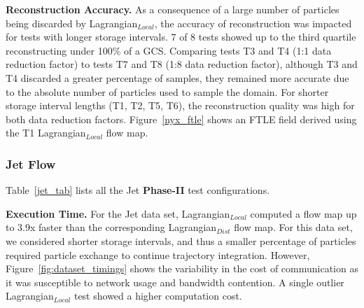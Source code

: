 \textbf{Reconstruction Accuracy.} As a consequence of a large number of particles being discarded by Lagrangian$_{Local}$, the accuracy of reconstruction was impacted for tests with longer storage intervals.
%
7 of 8 tests showed up to the third quartile reconstructing under 100\% of a GCS. 
%
Comparing tests T3 and T4 (1:1 data reduction factor) to tests T7 and T8 (1:8 data reduction factor), although T3 and T4 discarded a greater percentage of samples, they remained more accurate due to the absolute number of particles used to sample the domain.
%
For shorter storage interval lengths (T1, T2, T5, T6), the reconstruction quality was high for both data reduction factors.
%
Figure~\ref{nyx_ftle} shows an FTLE field derived using the T1 Lagrangian$_{Local}$ flow map. 
%


%


\subsubsection{Jet Flow}
\label{sec:jet}
Table~\ref{jet_tab} lists all the Jet \textbf{Phase-II} test configurations.
%


\textbf{Execution Time.} For the Jet data set, Lagrangian$_{Local}$ computed a flow map up to 3.9x faster than the corresponding Lagrangian$_{Dist}$ flow map.
%
For this data set, we considered shorter storage intervals, and thus a smaller percentage of particles required particle exchange to continue trajectory integration.
%
However, Figure~\ref{fig:dataset_timings} shows the variability in the cost of communication as it was susceptible to network usage and bandwidth contention.
%
A single outlier Lagrangian$_{Local}$ test showed a higher computation cost. 


